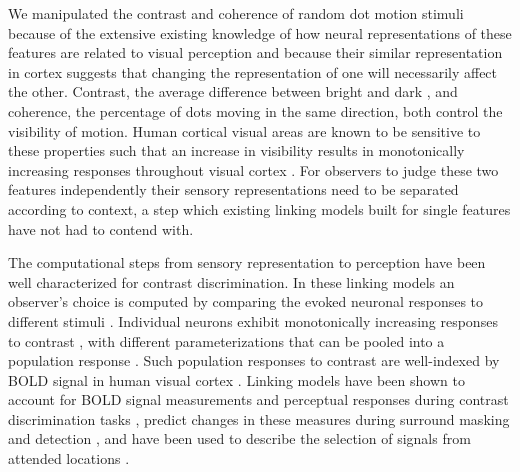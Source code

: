 We manipulated the contrast and coherence of random dot motion stimuli because of the extensive existing knowledge of how neural representations of these features are related to  visual perception \citep{Gold2007-ys} and because their similar representation in cortex suggests that changing the representation of one will necessarily affect the other. Contrast, the average difference between bright and dark \citep{Bex2002-it}, and coherence, the percentage of dots moving in the same direction, both control the visibility of motion. Human cortical visual areas are known to be sensitive to these properties such that an increase in visibility results in monotonically increasing responses throughout visual cortex \citep{Avidan2002-jg,Birman2018-sp,Britten1993-oh,Gardner2005-pg,Logothetis2001-kk,Olman2004-dd,Boynton1996-ff,Olman2004-dd,Rees2000-ul,Tootell1998-bb,Simoncelli1998-ts}. For observers to judge these two features independently their sensory representations need to be separated according to context, a step which existing linking models built for single features have not had to contend with.

The computational steps from sensory representation to perception have been well characterized for contrast discrimination. In these linking models an observer’s choice is computed by comparing the evoked neuronal responses to different stimuli \citep{Boynton1999-jd,Foley1981-aw,Ling2006-zx,Nachmias1974-vz,Pestilli2009-xu}. Individual neurons exhibit monotonically increasing responses to contrast \citep{Albrecht1982-rq}, with different parameterizations \citep{Tolhurst1983-cv} that can be pooled into a population response \citep{Shadlen1996-pr}. Such population responses to contrast are well-indexed by BOLD signal in human visual cortex \citep{Avidan2002-jg,Boynton1996-ff,Boynton1999-jd,Gardner2005-pg,Heeger2000-pq,Logothetis2001-kk}. Linking models have been shown to account for BOLD signal measurements and perceptual responses during contrast discrimination tasks \citep{Boynton1999-jd}, predict changes in these measures during surround masking \citep{Zenger-Landolt2003-kq} and detection \citep{Ress2000-pa}, and have been used to describe the selection of signals from attended locations \citep{Hara2014-mv,Pestilli2011-gi}. 

